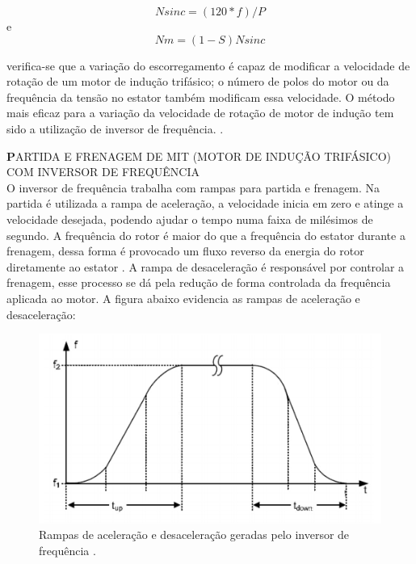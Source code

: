     \begin{equation}\label{Rotação Sinc.}
            Nsinc=(120*f)/P
    \end{equation}
    e
    \begin{equation}\label{Rotação Sinc.}
     Nm=(1-S)Nsinc
    \end{equation} 
    
     verifica-se que a variação do escorregamento é capaz de modificar a velocidade de rotação de um motor de indução trifásico; o número de polos do motor ou da frequência da tensão no estator também modificam essa velocidade. O método mais eficaz para a variação da velocidade de rotação de motor de indução tem sido a utilização de inversor de frequência. \cite{WEG2}.  
     
     \textbf PARTIDA E FRENAGEM DE MIT (MOTOR DE INDUÇÃO TRIFÁSICO) COM INVERSOR DE FREQUÊNCIA\\
     
     O inversor de frequência trabalha com rampas para partida e frenagem. Na partida é utilizada a rampa de aceleração, a velocidade inicia em zero e atinge a velocidade desejada, podendo ajudar o tempo numa faixa de milésimos de segundo. 
    A frequência do rotor é maior do que a frequência do estator durante a frenagem, dessa forma é provocado um fluxo reverso da energia do rotor diretamente ao estator \cite{covino}. A rampa de desaceleração é responsável por controlar a frenagem, esse processo se dá pela redução de forma controlada da frequência aplicada ao motor.
    A figura abaixo evidencia as rampas de aceleração e desaceleração:\\

 \begin{figure}[h]    
 		\centering
		\label{oldr}
		\includegraphics[keepaspectratio=true,scale=0.75]{figuras/rampa_aceleracao.png}
		\caption{Rampas de aceleração e desaceleração geradas pelo inversor de frequência \cite{siemens}.}
		\end{figure}  
        
